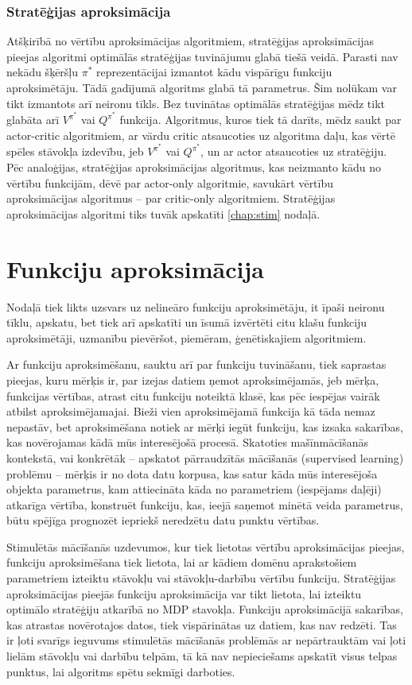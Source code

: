 \documentclass{ludis} %
\begin{document}
\subsection{Stratēģijas aproksimācija}
Atšķirībā no vērtību aproksimācijas algoritmiem, stratēģijas aproksimācijas pieejas algoritmi optimālās stratēģijas tuvinājumu glabā tiešā veidā.
Parasti nav nekādu šķēršļu $\pi^*$ reprezentācijai izmantot kādu vispārīgu funkciju aproksimētāju. Tādā gadījumā algoritms glabā tā parametrus.
Šim nolūkam var tikt izmantots arī neironu tīkls.
Bez tuvinātas optimālās stratēģijas mēdz tikt glabāta arī $V^{\pi^*}$ vai $Q^{\pi^*}$ funkcija.
Algoritmus, kuros tiek tā darīts, mēdz saukt par actor-critic algoritmiem, ar vārdu critic atsaucoties uz algoritma daļu, kas vērtē spēles stāvokļa izdevību, jeb $V^{\pi^*}$ vai $Q^{\pi^*}$, un ar actor atsaucoties uz stratēģiju.
Pēc analoģijas, stratēģijas aproksimācijas algoritmus, kas neizmanto kādu no vērtību funkcijām, dēvē par actor-only algoritmie, savukārt vērtību aproksimācijas algoritmus -- par critic-only algoritmiem.
Stratēģijas aproksimācijas algoritmi tiks tuvāk apskatīti \ref{chap:stim} nodaļā.

\chapter{Funkciju aproksimācija}
Nodaļā tiek likts uzsvars uz nelineāro funkciju aproksimētāju, it īpaši neironu tīklu, apskatu, bet tiek arī apskatīti un īsumā izvērtēti citu klašu funkciju aproksimētāji, uzmanību pievēršot, piemēram, ģenētiskajiem algoritmiem.

Ar funkciju aproksimēšanu, sauktu arī par funkciju tuvināšanu, tiek saprastas pieejas, kuru mērķis ir, par izejas datiem ņemot aproksimējamās, jeb mērķa, funkcijas vērtības, atrast citu funkciju noteiktā klasē, kas pēc iespējas vairāk atbilst aproksimējamajai.
Bieži vien aproksimējamā funkcija kā tāda nemaz nepastāv, bet aproksimēšana notiek ar mērķi iegūt funkciju, kas izsaka sakarības, kas novērojamas kādā mūs interesējošā procesā.
Skatoties mašīnmācīšanās kontekstā, vai konkrētāk -- apskatot pārraudzītās mācīšanās (supervised learning) problēmu -- mērķis ir no dota datu korpusa, kas satur kāda mūs interesējoša objekta parametrus, kam attiecināta kāda no parametriem (iespējams daļēji) atkarīga vērtība, konstruēt funkciju, kas, ieejā saņemot minētā veida parametrus, būtu spējīga prognozēt iepriekš neredzētu datu punktu vērtības.

Stimulētās mācīšanās uzdevumos, kur tiek lietotas vērtību aproksimācijas pieejas, funkciju aproksimēšana tiek lietota, lai ar kādiem domēnu aprakstošiem parametriem izteiktu stāvokļu vai stāvokļu-darbību vērtību funkciju. Stratēģijas aproksimācijas pieejās funkciju aproksimācija var tikt lietota, lai izteiktu optimālo stratēģiju atkarībā no MDP stavokļa.
Funkciju aproksimācijā sakarības, kas atrastas novērotajos datos, tiek vispārinātas uz datiem, kas nav redzēti. Tas ir ļoti svarīgs ieguvums stimulētās mācīšanās problēmās ar nepārtrauktām vai ļoti lielām stāvokļu vai darbību telpām, tā kā nav nepieciešams apskatīt visus telpas punktus, lai algoritms spētu sekmīgi darboties.
\end{document}
